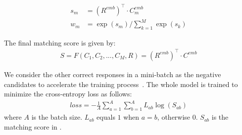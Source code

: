 \begin{equation}
\begin{aligned}
s_m &= (R^{emb})^\top \cdot C^{emb}_m\\
w_m &= \exp(s_m)/\sum_{k=1}^M\exp(s_k)
\end{aligned}
\end{equation}

The final matching score is given by:
\begin{equation}
\begin{aligned}
S = F(C_1, C_2, ..., C_M, R) = (R^{emb})^\top\cdot C^{emb}
\end{aligned}
\label{eq:matching_score}
\end{equation}

We consider the other correct responses in a mini-batch as the negative candidates to accelerate the training process~\cite{MazareHRB18}. The whole model is trained to minimize the cross-entropy loss as follows:
\begin{equation}
\begin{aligned}
loss = - \frac{1}{A}\sum_{a=1}^{A}\sum_{b=1}^{A} L_{ab}\log(S_{ab})
\end{aligned}
\end{equation}
where $A$ is the batch size. $L_{ab}$ equals $1$ when $a=b$, otherwise $0$. $S_{ab}$ is the matching score in .

